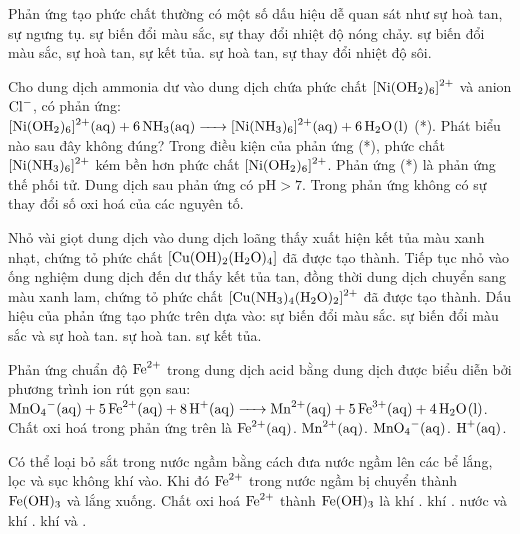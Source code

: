 \documentclass[11pt,a4paper]{article}
\begin{document}
\begin{ex}
Phản ứng tạo phức chất thường có một số dấu hiệu dễ quan sát như
\choice
{sự hoà tan, sự ngưng tụ.}
{sự biến đổi màu sắc, sự thay đổi nhiệt độ nóng chảy.}
{sự biến đổi màu sắc, sự hoà tan, sự kết tủa.}
{sự hoà tan, sự thay đổi nhiệt độ sôi.}
\loigiai{}
\end{ex}

\begin{ex}
Cho dung dịch ammonia dư vào dung dịch chứa phức chất $\ce{[Ni(OH2)6]^2+}$ và anion $\ce{Cl-}$, có phản ứng: $\ce{[Ni(OH2)6]^2+(aq) + 6NH3(aq) -> [Ni(NH3)6]^2+(aq) + 6H2O(l)}$ (*). Phát biểu nào sau đây không đúng?
\choice
{Trong điều kiện của phản ứng (*), phức chất $\ce{[Ni(NH3)6]^2+}$ kém bền hơn phức chất $\ce{[Ni(OH2)6]^2+}$.}
{Phản ứng (*) là phản ứng thế phối tử.}
{Dung dịch sau phản ứng có $\text{pH} > 7$.}
{Trong phản ứng không có sự thay đổi số oxi hoá của các nguyên tố.}
\loigiai{}
\end{ex}

\begin{ex}
Nhỏ vài giọt dung dịch  vào dung dịch  loãng thấy xuất hiện kết tủa màu xanh nhạt, chứng tỏ phức chất $\ce{[Cu(OH)2(H2O)4]}$ đã được tạo thành. Tiếp tục nhỏ vào ống nghiệm dung dịch  đến dư thấy kết tủa tan, đồng thời dung dịch chuyển sang màu xanh lam, chứng tỏ phức chất $\ce{[Cu(NH3)4(H2O)2]^2+}$ đã được tạo thành. Dấu hiệu của phản ứng tạo phức trên dựa vào:
\choice
{sự biến đổi màu sắc.}
{sự biến đổi màu sắc và sự hoà tan.}
{sự hoà tan.}
{sự kết tủa.}
\loigiai{}
\end{ex}

\begin{ex}
Phản ứng chuẩn độ $\ce{Fe^2+}$ trong dung dịch acid bằng dung dịch  được biểu diễn bởi phương trình ion rút gọn sau: $\ce{MnO4-(aq) + 5Fe^2+(aq) + 8H+(aq) -> Mn^2+(aq) + 5Fe^3+(aq) + 4H2O(l)}$. Chất oxi hoá trong phản ứng trên là
\choice
{$\ce{Fe^2+(aq)}$.}
{$\ce{Mn^2+(aq)}$.}
{$\ce{MnO4-(aq)}$.}
{$\ce{H+(aq)}$.}
\loigiai{}
\end{ex}

\begin{ex}
Có thể loại bỏ sắt trong nước ngầm bằng cách đưa nước ngầm lên các bể lắng, lọc và sục không khí vào. Khi đó $\ce{Fe^2+}$ trong nước ngầm bị chuyển thành $\ce{Fe(OH)3}$ và lắng xuống. Chất oxi hoá $\ce{Fe^2+}$ thành $\ce{Fe(OH)3}$ là
\choice
{khí .}
{khí .}
{nước và khí .}
{khí  và .}
\loigiai{}
\end{ex}
\end{document}
